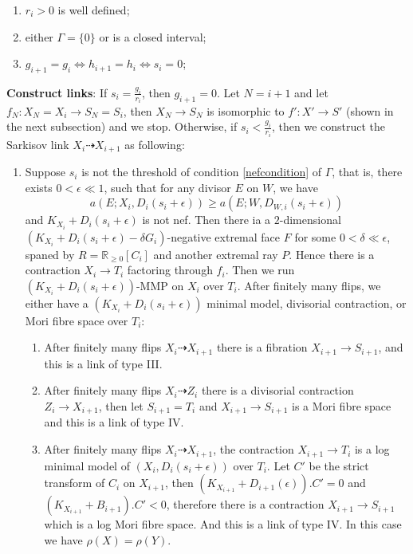 \documentclass{article}
\begin{document}
\begin{enumerate}
    \item $r_{i}>0$ is well defined;
    \item either $\Gamma=\{0\} $ or is a closed interval;
    \item $g_{i+1}=g_{i} \Leftrightarrow h_{i+1}=h_{i} \Leftrightarrow s_{i}=0$;
\end{enumerate}
\textbf{Construct links}: If $s_{i}=\frac{g_{i}}{r_{i}}$, then $g_{i+1}=0$. Let $N=i+1$  and let $f_{N}:X_{N}=X_{i} \to S_{N}=S_{i}$, then $X_{N}\to S_{N}$ is isomorphic to $f':X'\to S'$ (shown in the next subsection) and  we stop. Otherwise, if  $s_{i}<\frac{g_{i}}{r_{i}}$, then we construct the Sarkisov link $X_{i}\dashrightarrow X_{i+1}$  as following:
\begin{enumerate}
  \item\label{2a} Suppose $s_{i}$ is not the threshold of  condition \ref{nefcondition} of $\Gamma$, that is, there exists $0<\epsilon\ll 1$, such that for any divisor $E$ on $W$, we have
    \[
      a(E;X_{i},D_{i}(s_{i}+\epsilon))\geqslant a(E;W,D_{W,i}(s_{i}+\epsilon))
    \]
    and $K_{X_{i}}+D_{i}(s_{i}+\epsilon)$ is not nef. Then there ia a $2$-dimensional $(K_{X_{i}}+D_{i}(s_{i}+\epsilon)-\delta G_{i})$-negative extremal face $F$ for some $0< \delta \ll \epsilon $, spaned by $R=\mathbb{R}_{\geqslant 0}[C_{i}]$ and another extremal ray $P$. Hence there is a contraction $X_{i}\to T_{i}$ factoring through $f_{i}$. Then we run $(K_{X_{i}}+D_{i}(s_{i}+\epsilon))$-MMP on $X_{i}$ over $T_{i}$. After finitely many flips, we either have a $(K_{X_{i}}+D_{i}(s_{i}+\epsilon))$ minimal model, divisorial contraction, or Mori fibre space over $T_{i}$: 
    \begin{enumerate}
    \item\label{2a1}After finitely many flips $X_{i}\dashrightarrow X_{i+1}$ there is a fibration $X_{i+1}\to S_{i+1}$, and this is a link of type III.
    \item\label{2a2} After finitely many flips $X_{i}\dashrightarrow Z_{i}$ there is a divisorial contraction $Z_{i}\to X_{i+1}$, then let $S_{i+1}=T_{i}$ and $X_{i+1}\to S_{i+1}$ is a Mori fibre space and this is a link of type IV.
    \item \label{2a3}After finitely many flips $X_{i}\dashrightarrow X_{i+1}$,  the contraction $X_{i+1}\to T_{i}$ is a log minimal model of $\left(X_{i},D_{i}\left(s_{i}+\epsilon\right)\right)$ over $T_{i}$. Let  $C'$ be the strict transform of  $C_{i}$ on $X_{i+1}$, then $(K_{X_{i+1}}+D_{i+1}(\epsilon)).C'=0$ and $(K_{X_{i+1}}+B_{i+1}).C'<0$, therefore there is a contraction  $X_{i+1} \to S_{i+1}$ which is a log Mori fibre space. And this is a link of type IV. In this case we have $\rho(X)=\rho(Y)$. 

\end{enumerate}
\end{enumerate}
\end{document}

